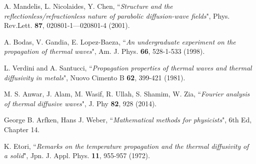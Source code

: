 \documentclass[12pt,a4]{article}
\begin{document}
\begin{thebibliography}{99}

 A. Mandelis, L. Nicolaides, Y. Chen, ``\emph{Structure and the reflectionless/refractionless nature of parabolic diffusion-wave fields}", Phys. Rev.Lett. \textbf{87}, 020801-1---020801-4 (2001).

 A. Bodas, V. Gandia, E. Lopez-Baeza, ``\emph{An undergraduate experiment on the propagation of thermal waves}", Am. J. Phys. \textbf{66}, 528-1-533 (1998).

 L. Verdini and A. Santucci, ``\emph{Propagation properties of thermal waves and
thermal diffusivity in metals}", Nuovo Cimento B \textbf{62}, 399-421 (1981).


 M. S. Anwar, J. Alam, M. Wasif, R. Ullah, S. Shamim, W. Zia, ``\emph{Fourier analysis of thermal diffusive waves}", J. Phy \textbf{82}, 928 (2014).

 George B. Arfken, Hans J. Weber, ``\emph{Mathematical methods for physicists}", 6th Ed, Chapter 14.

 K. Etori, ``\emph{Remarks on the temperature propagation and the thermal diffusivity of a solid}", Jpn. J. Appl. Phys. \textbf{11}, 955-957 (1972).


\end{thebibliography}
\end{document}
